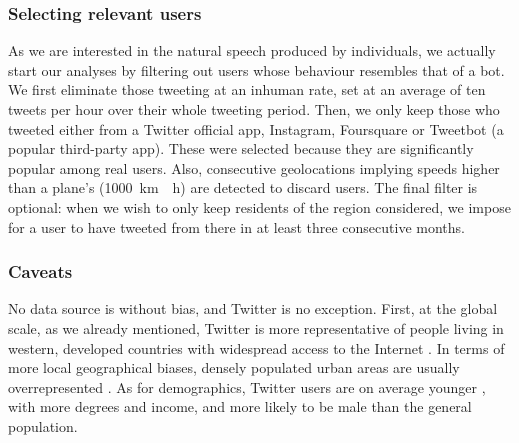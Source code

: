 \documentclass[../thesis.tex]{subfiles}
\begin{document}
\subsubsection{Selecting relevant users}
\label{sec:method_users_select}
As we are interested in the natural speech produced by individuals, we actually start
our analyses by filtering out users whose behaviour resembles that of a bot. We first
eliminate those tweeting at an inhuman rate, set at an average of ten tweets per hour
over their whole tweeting period. Then, we only keep those who tweeted either from a
Twitter official app, Instagram, Foursquare or Tweetbot (a popular third-party app).
These were selected because they are significantly popular among real users. Also,
consecutive geolocations implying speeds higher than a plane's (\SI{1000}{\kilo \meter
\per \hour}) are detected to discard users. The final filter is optional: when we wish
to only keep residents of the region considered, we impose for a user to have tweeted
from there in at least three consecutive months.


\subsubsection{Caveats}
No data source is without bias, and Twitter is no exception. First, at the global scale,
as we already mentioned, Twitter is more representative of people living in western,
developed countries with widespread access to the Internet
\cite{HawelkaGeolocatedTwitter2014,MocanuTwitterBabel2013}. In terms of more local
geographical biases, densely populated urban areas are usually overrepresented
\cite{MisloveUnderstandingDemographics2011,JiangUnderstandingDemographic2019,AuxierSocialMedia2021}.
As for demographics, Twitter users are on average younger
\cite{NguyenHowOld2013,AuxierSocialMedia2021,SloanWhoTweets2017}, with more degrees and
income, and more likely to be male
\cite{MisloveUnderstandingDemographics2011,AuxierSocialMedia2021,SloanWhoTweets2017} than the general population.
\end{document}

